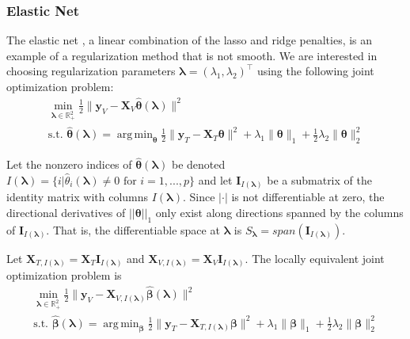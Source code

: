 \documentclass{statsoc}
\DeclareMathOperator*{\argmin}{arg\,min}
\begin{document}
\subsubsection{Elastic Net}\label{sec:enet}

The elastic net \citep{zou2003regression}, a linear combination of the lasso and ridge penalties, is an example of a regularization method that is not smooth. We are interested in choosing regularization parameters $\boldsymbol{\lambda} = (\lambda_1, \lambda_2)^\top$ using the following joint optimization problem:
\begin{equation}
\begin{array}{c}
\min_{\boldsymbol{\lambda} \in \mathbb{R}^2_{+}} \frac{1}{2} \| \boldsymbol{y}_V - \boldsymbol{X}_V \hat{\boldsymbol{\theta}} (\boldsymbol \lambda) \| ^2 \\
\text{s.t. }
\hat{\boldsymbol{\theta}} (\boldsymbol{\lambda}) = \argmin_{\boldsymbol{\theta}} \frac{1}{2} \| \boldsymbol{y}_T - \boldsymbol{X}_T \boldsymbol{\theta} \| ^2
+ \lambda_1 \| \boldsymbol{\theta} \|_1
+ \frac{1}{2}\lambda_2 \| \boldsymbol{\theta} \|_2^2
\end{array}
\end{equation}

Let the nonzero indices of $\hat{\boldsymbol{\theta}}(\boldsymbol{\lambda})$ be denoted $I(\boldsymbol\lambda) = \{i | \hat{\theta}_i(\boldsymbol\lambda) \ne 0 \text{ for } i=1,...,p \}$ and let $\boldsymbol I_{I(\boldsymbol \lambda)}$ be a submatrix of the identity matrix with columns $I(\boldsymbol\lambda)$. Since $|\cdot|$ is not differentiable at zero, the directional derivatives of $||\boldsymbol \theta||_1$ only exist along directions spanned by the columns of $\boldsymbol I_{I(\boldsymbol \lambda)}$. That is, the differentiable space at $\boldsymbol \lambda$ is $S_{\boldsymbol{\lambda}} = span(\boldsymbol I_{I(\boldsymbol \lambda)})$.

Let $\boldsymbol{X}_{T, I(\boldsymbol\lambda)} = \boldsymbol{X}_T \boldsymbol{I}_{I(\boldsymbol \lambda)}$ and $\boldsymbol{X}_{V, I(\boldsymbol\lambda)}  = \boldsymbol{X}_V \boldsymbol{I}_{I(\boldsymbol \lambda)}$. The locally equivalent joint optimization problem is
\begin{equation}
\begin{array}{c}
\min_{\boldsymbol{\lambda} \in \mathbb{R}^2_{+}} \frac{1}{2} \| \boldsymbol{y}_V - \boldsymbol{X}_{V, I(\boldsymbol \lambda)} \hat{\boldsymbol{\beta}} (\boldsymbol \lambda) \| ^2 \\
\text{s.t. }
\hat{\boldsymbol{\beta}} (\boldsymbol{\lambda}) = \argmin_{\boldsymbol \beta} \frac{1}{2} \| \boldsymbol{y}_T - \boldsymbol{X}_{T, I(\boldsymbol \lambda)} \boldsymbol \beta \| ^2
+ \lambda_1 \| \boldsymbol \beta \|_1
+ \frac{1}{2}\lambda_2 \| \boldsymbol \beta \|_2^2
\end{array}
\end{equation}
\end{document}
